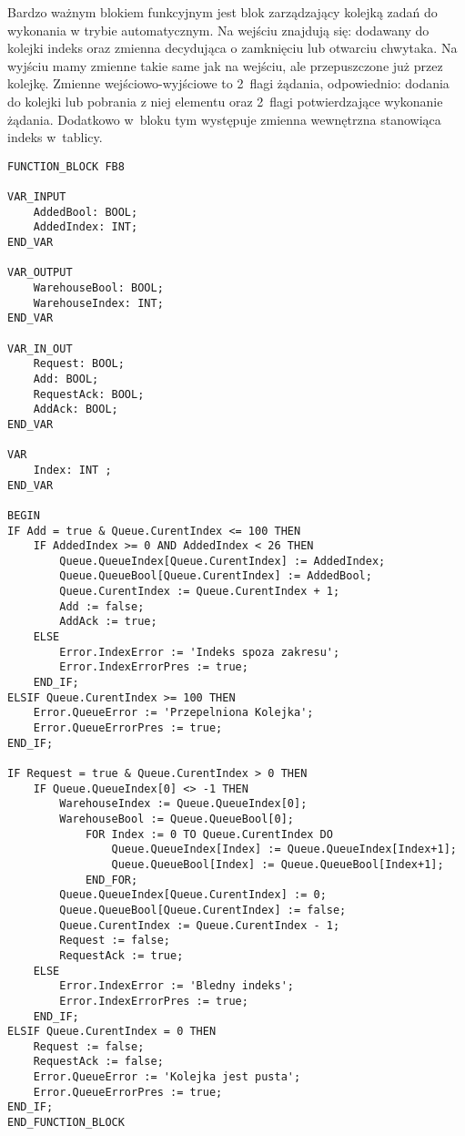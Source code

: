 Bardzo ważnym blokiem funkcyjnym jest blok zarządzający kolejką zadań do wykonania w trybie automatycznym. Na wejściu znajdują się: dodawany do kolejki indeks oraz zmienna decydująca o zamknięciu lub otwarciu chwytaka. Na wyjściu mamy zmienne takie same jak na wejściu, ale przepuszczone już przez kolejkę. Zmienne wejściowo-wyjściowe to 2~flagi żądania, odpowiednio: dodania do kolejki lub pobrania z niej elementu oraz 2~flagi potwierdzające wykonanie żądania. Dodatkowo w~bloku tym występuje zmienna wewnętrzna stanowiąca indeks w~tablicy. 
\newpage
\begin{lstlisting}[caption={FB8 - Zarządzanie kolejką}]
FUNCTION_BLOCK FB8

VAR_INPUT
    AddedBool: BOOL;
    AddedIndex: INT;
END_VAR     

VAR_OUTPUT 
    WarehouseBool: BOOL;
    WarehouseIndex: INT;
END_VAR  

VAR_IN_OUT
    Request: BOOL;
    Add: BOOL;
    RequestAck: BOOL;
    AddAck: BOOL;
END_VAR  

VAR
    Index: INT ;
END_VAR

BEGIN
IF Add = true & Queue.CurentIndex <= 100 THEN
    IF AddedIndex >= 0 AND AddedIndex < 26 THEN
        Queue.QueueIndex[Queue.CurentIndex] := AddedIndex;
        Queue.QueueBool[Queue.CurentIndex] := AddedBool;
        Queue.CurentIndex := Queue.CurentIndex + 1;
        Add := false;
        AddAck := true;
    ELSE
        Error.IndexError := 'Indeks spoza zakresu';    
        Error.IndexErrorPres := true;
    END_IF;
ELSIF Queue.CurentIndex >= 100 THEN   
    Error.QueueError := 'Przepelniona Kolejka';
    Error.QueueErrorPres := true;    
END_IF;

IF Request = true & Queue.CurentIndex > 0 THEN
    IF Queue.QueueIndex[0] <> -1 THEN        
        WarehouseIndex := Queue.QueueIndex[0];
        WarehouseBool := Queue.QueueBool[0];
            FOR Index := 0 TO Queue.CurentIndex DO
                Queue.QueueIndex[Index] := Queue.QueueIndex[Index+1];
                Queue.QueueBool[Index] := Queue.QueueBool[Index+1]; 
            END_FOR;        
        Queue.QueueIndex[Queue.CurentIndex] := 0;
        Queue.QueueBool[Queue.CurentIndex] := false;
        Queue.CurentIndex := Queue.CurentIndex - 1;
        Request := false;
        RequestAck := true;
    ELSE
        Error.IndexError := 'Bledny indeks';    
        Error.IndexErrorPres := true;            
    END_IF;    
ELSIF Queue.CurentIndex = 0 THEN
    Request := false;   
    RequestAck := false;     
    Error.QueueError := 'Kolejka jest pusta';    
    Error.QueueErrorPres := true;
END_IF;
END_FUNCTION_BLOCK
\end{lstlisting}
